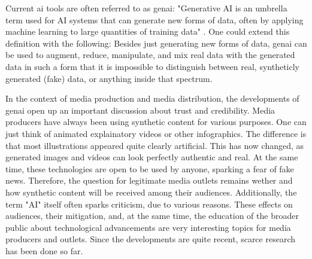 \documentclass[
  a4paper,  %
  twoside,  %
  bibliography=totoc,
  headsepline,
  cleardoublepage=empty,
  parskip=half,
  draft=false
]{scrbook}
\begin{document}
Current \gls{ai} tools are often referred to as \gls{genai}: "Generative AI is an umbrella term used for AI systems that can generate new forms of data, often by applying machine learning to large quantities of training data" \cite{arguedasAutomatingDemocracyGenerative2023}. One could extend this definition with the following: Besides just generating new forms of data, \gls{genai} can be used to augment, reduce, manipulate, and mix real data with the generated data in such a form that it is impossible to distinguish between real, syntheticly generated (fake) data, or anything inside that spectrum.

In the context of media production and media distribution, the developments of \gls{genai} open up an important discussion about trust and credibility. Media producers have always been using synthetic content for various purposes. One can just think of animated explainatory videos or other infographics. The difference is that most illustrations appeared quite clearly artificial. This has now changed, as generated images and videos can look perfectly authentic and real. At the same time, these technologies are open to be used by anyone, sparking a fear of fake news. Therefore, the question for legitimate media outlets remains wether and how synthetic content will be received among their audiences. Additionally, the term "AI" itself often sparks criticism, due to various reasons. These effects on audiences, their mitigation, and, at the same time, the education of the broader public about technological advancements are very interesting topics for media producers and outlets. Since the developments are quite recent, scarce research has been done so far.
\end{document}
